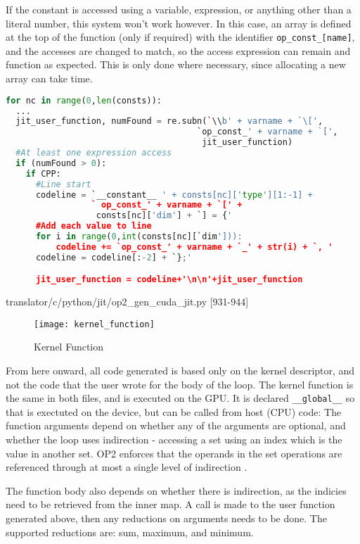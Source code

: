 If the constant is accessed using a variable, expression, or anything other than a literal number, this system won't work however. In this case, an array is defined at the top of the function (only if required) with the identifier \verb|op_const_[name]|, and the accesses are changed to match, so the access expression can remain and function as expected. This is only done where necessary, since allocating a new array can take time.
\begin{lstlisting}[backgroundcolor = \color{lightgray!20}, language=Python]
for nc in range(0,len(consts)):
  ...
  jit_user_function, numFound = re.subn(`\\b' + varname + `\[',
                                      `op_const_' + varname + `[',
                                       jit_user_function)
  #At least one expression access
  if (numFound > 0):
    if CPP:
      #Line start
      codeline = `__constant__ ' + consts[nc]['type'][1:-1] +
                 ` op_const_' + varname + `[' +
                  consts[nc]['dim'] + `] = {'
      #Add each value to line
      for i in range(0,int(consts[nc][`dim'])):
          codeline += `op_const_' + varname + `_' + str(i) + `, '
      codeline = codeline[:-2] + `};'

      jit_user_function = codeline+'\n\n'+jit_user_function
\end{lstlisting}
\vspace{-1em}
\hspace*{\fill}\footnotesize{translator/c/python/jit/op2\_gen\_cuda\_jit.py [931-944]}

\begin{wrapfigure}[17]{r}{.33\textwidth}
  \vspace{-1.2cm}
  \centering
  \caption{Kernel Function}
  \label{fig:krnl_func}
  \texttt{[image: kernel\_function]}
\end{wrapfigure}
From here onward, all code generated is based only on the kernel descriptor, and not the code that the user wrote for the body of the loop. The kernel function is the same in both files, and is executed on the GPU. It is declared \verb|__global__| so that is exectuted on the device, but can be called from host (CPU) code:
The function arguments depend on whether any of the arguments are optional, and whether the loop uses indirection - accessing a set using an index which is the value in another set. OP2 enforces that the operands in the set operations are referenced through at most a single level of indirection \cite[p4]{manual}.
\par
The function body also depends on whether there is indirection, as the indicies need to be retrieved from the inner map. A call is made to the user function generated above, then any reductions on arguments needs to be done. The supported reductions are: sum, maximum, and minimum\cite[p11]{manual}.

